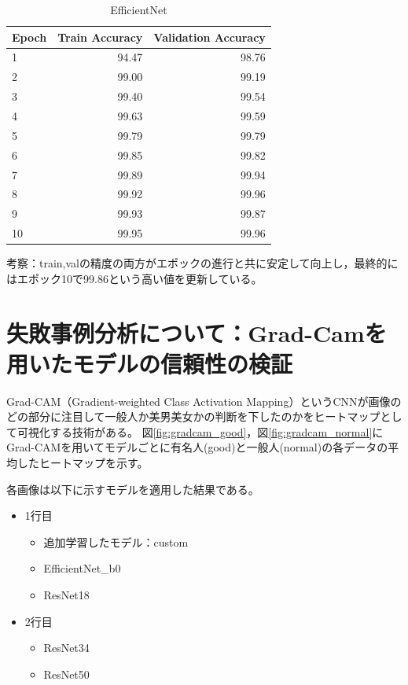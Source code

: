 \documentclass[a4paper,11pt,titlepage]{jsarticle}
\begin{document}
\begin{table}[H]
\centering
\caption{EfficientNet}
\label{tab:efficientnet}
\begin{tabular}{lrr}
\hline
 Epoch &  Train Accuracy &  Validation Accuracy \\
\hline
     1 &           94.47 &                98.76 \\
     2 &           99.00 &                99.19 \\
     3 &           99.40 &                99.54 \\
     4 &           99.63 &                99.59 \\
     5 &           99.79 &                99.79 \\
     6 &           99.85 &                99.82 \\
     7 &           99.89 &                99.94 \\
     8 &           99.92 &                99.96 \\
     9 &           99.93 &                99.87 \\
    10 &           99.95 &                99.96 \\
\hline
\end{tabular}
\end{table}


考察：train,valの精度の両方がエポックの進行と共に安定して向上し，最終的にはエポック10で99.86という高い値を更新している。




\section{失敗事例分析について：Grad-Camを用いたモデルの信頼性の検証}
Grad-CAM（Gradient-weighted Class Activation Mapping）というCNNが画像のどの部分に注目して一般人か美男美女かの判断を下したのかをヒートマップとして可視化する技術がある。
図\ref{fig:gradcam_good}，図\ref{fig:gradcam_normal}にGrad-CAMを用いてモデルごとに有名人(good)と一般人(normal)の各データの平均したヒートマップを示す。

各画像は以下に示すモデルを適用した結果である。
\begin{itemize}
	\item 1行目
	\begin{itemize}
	\item 追加学習したモデル：custom
	\item EfficientNet\_b0
	\item ResNet18
	\end{itemize}
	\item 2行目
	\begin{itemize}
	\item ResNet34
	\item ResNet50
	\end{itemize}
\end{itemize}
\end{document}
